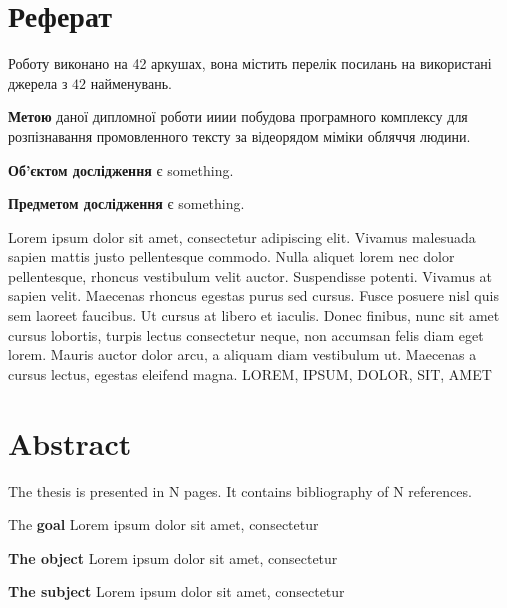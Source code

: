 \chapter*{Реферат}
\pagestyle{empty}
\thispagestyle{empty}

Роботу виконано на 42 аркушах, вона містить перелік посилань на використані джерела з $42$ найменувань.

\textbf{Метою} даної дипломної роботи ииии побудова програмного комплексу для розпізнавання промовленного тексту за відеорядом міміки обляччя людини.

\textbf{Об'єктом дослідження} є something.

\textbf{Предметом дослідження} є something.

Lorem ipsum dolor sit amet, consectetur adipiscing elit. Vivamus malesuada sapien mattis justo pellentesque commodo. Nulla aliquet lorem nec dolor pellentesque, rhoncus vestibulum velit auctor. Suspendisse potenti. Vivamus at sapien velit. Maecenas rhoncus egestas purus sed cursus. Fusce posuere nisl quis sem laoreet faucibus. Ut cursus at libero et iaculis. Donec finibus, nunc sit amet cursus lobortis, turpis lectus consectetur neque, non accumsan felis diam eget lorem. Mauris auctor dolor arcu, a aliquam diam vestibulum ut. Maecenas a cursus lectus, egestas eleifend magna. 
\MakeUppercase{Lorem, ipsum, dolor, sit, amet}

\chapter*{Abstract}
\thispagestyle{empty}
The thesis is presented in N pages. It contains bibliography of N references.


The \textbf{goal} Lorem ipsum dolor sit amet, consectetur

\textbf{The object} Lorem ipsum dolor sit amet, consectetur

\textbf{The subject} Lorem ipsum dolor sit amet, consectetur


